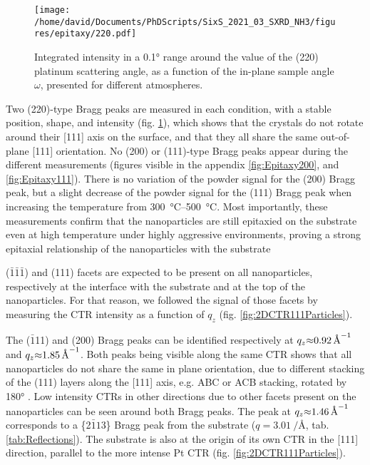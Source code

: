 \begin{figure}[!htb]
    \centering
    \texttt{[image: /home/david/Documents/PhDScripts/SixS\_2021\_03\_SXRD\_NH3/figures/epitaxy/220.pdf]}
    \caption{
        Integrated intensity in a \ang{0.1} range around the value of the (220) platinum scattering angle, as a function of the in-plane sample angle $\omega$, presented for different atmospheres.
    }
    \label{fig:Epitaxy220}
\end{figure}

Two (220)-type Bragg peaks are measured in each condition, with a stable position, shape, and intensity (fig. \ref{fig:Epitaxy220}), which shows that the crystals do not rotate around their [111] axis on the surface, and that they all share the same out-of-plane [111] orientation.
No (200) or (111)-type Bragg peaks appear during the different measurements (figures visible in the appendix \ref{fig:Epitaxy200}, and \ref{fig:Epitaxy111}).
There is no variation of the powder signal for the (200) Bragg peak, but a slight decrease of the powder signal for the (111) Bragg peak when increasing the temperature from \qtyrange{300}{500}{\degreeCelsius}.
Most importantly, these measurements confirm that the nanoparticles are still epitaxied on the substrate even at high temperature under highly aggressive environments, proving a strong epitaxial relationship of the nanoparticles with the substrate

($\bar{1}\bar{1}\bar{1}$) and (111) facets are expected to be present on all nanoparticles, respectively at the interface with the substrate and at the top of the nanoparticles.
For that reason, we followed the signal of those facets by measuring the CTR intensity as a function of $q_z$ (fig. \ref{fig:2DCTR111Particles}).

The ($\bar{1}$11) and (200) Bragg peaks can be identified respectively at $q_z \qty{\approx0.92}{\per\angstrom}$ and $q_z \qty{\approx1.85}{\per\angstrom}$.
Both peaks being visible along the same CTR shows that all nanoparticles do not share the same in plane orientation, due to different stacking of the (111) layers along the [111] axis, e.g. ABC or ACB stacking, rotated by \ang{180} \parencite{Jones2019}.
Low intensity CTRs in other directions due to other facets present on the nanoparticles can be seen around both Bragg peaks.
The peak at $q_z \qty{\approx1.46}{\per\angstrom}$ corresponds to a \{2$\bar{1}1$3\} Bragg peak from the  substrate ($q = \qty{3.01}{\per\angstrom}$, tab. \ref{tab:Reflections}).
The substrate is also at the origin of its own CTR in the [111] direction, parallel to the more intense Pt CTR (fig. \ref{fig:2DCTR111Particles}).

